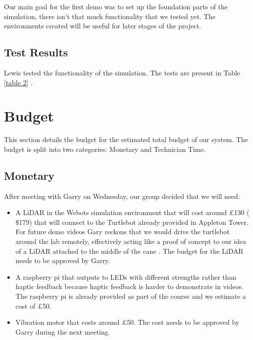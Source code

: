 \documentclass{article}
\begin{document}
Our main goal for the first demo was  to set up the foundation parts of the simulation, there isn't that much functionality that we tested yet. The environments created will be useful for later stages of the project. 

\subsection{Test Results}
Lewis tested the  functionality of the simulation. The tests are present in Table \ref{table 2} . 

\section{Budget}
This section details the budget for the estimated total budget of our system. The budget is split into two categories:  Monetary and Technician Time. 

\subsection{Monetary}
After meeting with Garry on Wednesday, our group decided that we will need: 
\begin{itemize}
    \item A LiDAR in the Webots simulation environment that will cost around £130 ( \$179)  that will connect to the Turtlebot  already provided in Appleton Tower. For future demo videos Gary reckons that we would drive the turtlebot around the lab remotely, effectively acting like a proof of concept to our idea of a LiDAR attached to the middle of the cane  \cite{emanual} \cite{Cyberbotics} .  The budget for the LiDAR needs to be approved by Garry. 
    \item A raspberry pi that outputs to LEDs with different strengths rather than haptic feedback because haptic feedback is harder to demonstrate in videos. The raspberry pi is already provided as part of the course and we estimate a cost of £50.
    \item Vibration motor that costs around £50. The cost needs to be approved by Garry during the next meeting. 
    
\end{itemize}
\end{document}
